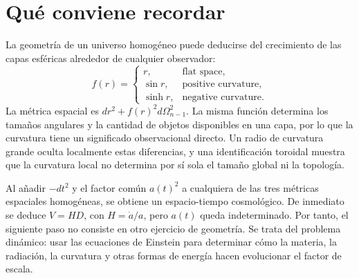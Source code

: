 \section{Qué conviene recordar}

La geometría de un universo homogéneo puede deducirse del crecimiento de las capas esféricas alrededor de cualquier observador:
\begin{equation}
f(r)=
\begin{cases}
r, & \text{flat space},\\
\sin r, & \text{positive curvature},\\
\sinh r, & \text{negative curvature}.
\end{cases}
\end{equation}
La métrica espacial es \(dr^2+f(r)^2d\Omega_{n-1}^2\). La misma función determina los tamaños angulares y la cantidad de objetos disponibles en una capa, por lo que la curvatura tiene un significado observacional directo. Un radio de curvatura grande oculta localmente estas diferencias, y una identificación toroidal muestra que la curvatura local no determina por sí sola el tamaño global ni la topología.

Al añadir \(-dt^2\) y el factor común \(a(t)^2\) a cualquiera de las tres métricas espaciales homogéneas, se obtiene un espacio-tiempo cosmológico. De inmediato se deduce \(V=HD\), con \(H=\dot a/a\), pero \(a(t)\) queda indeterminado. Por tanto, el siguiente paso no consiste en otro ejercicio de geometría. Se trata del problema dinámico: usar las ecuaciones de Einstein para determinar cómo la materia, la radiación, la curvatura y otras formas de energía hacen evolucionar el factor de escala.

